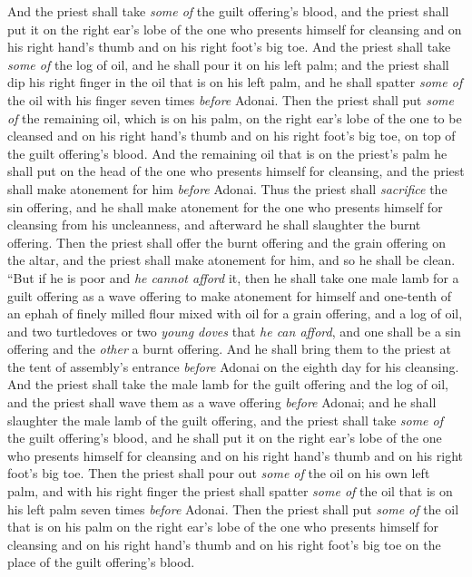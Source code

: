 \begin{biblechapter}
\verse And the priest shall take \textit{some of} the guilt offering’s blood, and the priest shall put it on the right ear’s lobe of the one who presents himself for cleansing and on his right hand’s thumb and on his right foot’s big toe.
\verse And the priest shall take \textit{some of} the log of oil, and he shall pour it on his left palm;
\verse and the priest shall dip his right finger in the oil that is on his left palm, and he shall spatter \textit{some of} the oil with his finger seven times \textit{before} Adonai.
\verse Then the priest shall put \textit{some of} the remaining oil, which is on his palm, on the right ear’s lobe of the one to be cleansed and on his right hand’s thumb and on his right foot’s big toe, on top of the guilt offering’s blood.
\verse And the remaining oil that is on the priest’s palm he shall put on the head of the one who presents himself for cleansing, and the priest shall make atonement for him \textit{before} Adonai.
\verse Thus the priest shall \textit{sacrifice} the sin offering, and he shall make atonement for the one who presents himself for cleansing from his uncleanness, and afterward he shall slaughter the burnt offering.
\verse Then the priest shall offer the burnt offering and the grain offering on the altar, and the priest shall make atonement for him, and so he shall be clean.
\verse “But if he is poor and \textit{he cannot afford} it, then he shall take one male lamb for a guilt offering as a wave offering to make atonement for himself and one-tenth of an ephah of finely milled flour mixed with oil for a grain offering, and a log of oil,
\verse and two turtledoves or two \textit{young doves} that \textit{he can afford}, and one shall be a sin offering and the \textit{other} a burnt offering.
\verse And he shall bring them to the priest at the tent of assembly’s entrance \textit{before} Adonai on the eighth day for his cleansing.
\verse And the priest shall take the male lamb for the guilt offering and the log of oil, and the priest shall wave them as a wave offering \textit{before} Adonai;
\verse and he shall slaughter the male lamb of the guilt offering, and the priest shall take \textit{some of} the guilt offering’s blood, and he shall put it on the right ear’s lobe of the one who presents himself for cleansing and on his right hand’s thumb and on his right foot’s big toe.
\verse Then the priest shall pour out \textit{some of} the oil on his own left palm,
\verse and with his right finger the priest shall spatter \textit{some of} the oil that is on his left palm seven times \textit{before} Adonai.
\verse Then the priest shall put \textit{some of} the oil that is on his palm on the right ear’s lobe of the one who presents himself for cleansing and on his right hand’s thumb and on his right foot’s big toe on the place of the guilt offering’s blood.

\end{biblechapter}

